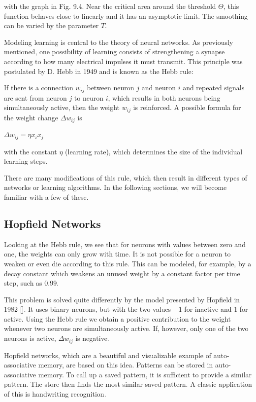 \documentclass[10pt]{book}
\begin{document}
with the graph in Fig. 9.4. Near the critical area around the threshold $\Theta$, this function behaves close to linearly and it has an asymptotic limit. The smoothing can be varied by the parameter $T$.

Modeling learning is central to the theory of neural networks. As previously mentioned, one possibility of learning consists of strengthening a synapse according to how many electrical impulses it must transmit. This principle was postulated by D. Hebb in 1949 and is known as the Hebb rule:

If there is a connection $w_{i j}$ between neuron $j$ and neuron $i$ and repeated signals are sent from neuron $j$ to neuron $i$, which results in both neurons being simultaneously active, then the weight $w_{i j}$ is reinforced. A possible formula for the weight change $\Delta w_{i j}$ is

$
\Delta w_{i j}=\eta x_{i} x_{j}
$

with the constant $\eta$ (learning rate), which determines the size of the individual learning steps.

There are many modifications of this rule, which then result in different types of networks or learning algorithms. In the following sections, we will become familiar with a few of these.

\subsection{Hopfield Networks}
Looking at the Hebb rule, we see that for neurons with values between zero and one, the weights can only grow with time. It is not possible for a neuron to weaken or even die according to this rule. This can be modeled, for example, by a decay constant which weakens an unused weight by a constant factor per time step, such as 0.99.

This problem is solved quite differently by the model presented by Hopfield in 1982 [\cite{hopfield1982emergent}]. It uses binary neurons, but with the two values $-1$ for inactive and $1$ for active. Using the Hebb rule we obtain a positive contribution to the weight whenever two neurons are simultaneously active. If, however, only one of the two neurons is active, $\Delta w_{i j}$ is negative.

Hopfield networks, which are a beautiful and visualizable example of auto-associative memory, are based on this idea. Patterns can be stored in auto-associative memory. To call up a saved pattern, it is sufficient to provide a similar pattern. The store then finds the most similar saved pattern. A classic application of this is handwriting recognition.
\end{document}
